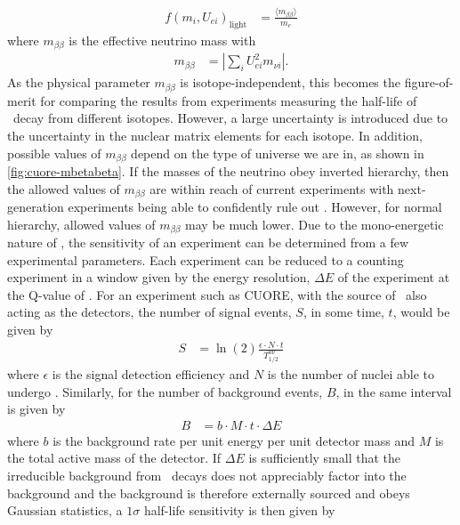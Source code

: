 \begin{align}
        f(m_i, U_{ei})_{\textrm{light}} &= \frac{\langle m_{\beta\beta}\rangle}{m_e}
\end{align}
where $m_{\beta\beta}$ is the effective neutrino mass with
\begin{align}
    m_{\beta\beta}&=|\sum_iU^2_{ei}m_{\nu i}|.
    \label{eq:mbetabeta}
\end{align}
As the physical parameter $m_{\beta\beta}$ is isotope-independent, this becomes the figure-of-merit for comparing the results from experiments measuring the half-life of \zeronubb~decay from different isotopes. However, a large uncertainty is introduced due to the uncertainty in the nuclear matrix elements for each isotope.
In addition, possible values of $m_{\beta\beta}$ depend on the type of universe we are in, as shown in \autoref{fig:cuore-mbetabeta}.
If the masses of the neutrino obey inverted hierarchy, then the allowed values of $m_{\beta\beta}$ are within reach of current experiments with next-generation experiments being able to confidently rule out \zeronubb. However, for normal hierarchy, allowed values of $m_{\beta\beta}$ may be much lower. 
Due to the mono-energetic nature of \zeronubb, the sensitivity of an experiment can be determined from a few experimental parameters.
Each experiment can be reduced to a counting experiment in a window given by the energy resolution, $\Delta E$ of the experiment at the Q-value of \zeronubb.
For an experiment such as CUORE, with the source of \zeronubb~also acting as the detectors, the number of signal events, $S$, in some time, $t$, would be given by
\begin{align}
    S &= \ln(2)\frac{\epsilon\cdot N \cdot t}{T^{0\nu}_{1/2}}
    \label{eq:signal_betabeta}
\end{align}
where $\epsilon$ is the signal detection efficiency and $N$ is the number of nuclei able to undergo \zeronubb.
Similarly, for the number of background events, $B$, in the same interval is given by
\begin{align}
    B &= b\cdot M \cdot t \cdot \Delta E
    \label{eq:background_betabeta}
\end{align}
where $b$ is the background rate per unit energy per unit detector mass and $M$ is the total active mass of the detector.
If $\Delta E$ is sufficiently small that the irreducible background from \twonubb~decays does not appreciably factor into the background and the background is therefore externally sourced and obeys Gaussian statistics, a $1\sigma$ half-life sensitivity is then given by
